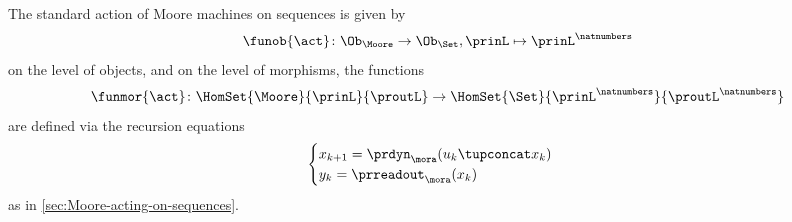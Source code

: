 \begin{definition}
\label{def:moore-standard-action-on-sequences}
The standard action of Moore machines on sequences is given by 
\begin{equation}
\funob{\act} \colon \Ob_{\Moore} \to \Ob_{\Set}, \prinL \mapsto \prinL^\natnumbers
\end{equation}
on the level of objects, and on the level of morphisms, the functions 
\begin{equation}
\funmor{\act} \colon  \HomSet{\Moore}{\prinL}{\proutL} \to \HomSet{\Set}{\prinL^\natnumbers}{\proutL^\natnumbers}
\end{equation}
are defined via the recursion equations
\begin{equation}
    \begin{cases}
        x_{k+1} = \prdyn_\mora(u_k \tupconcat x_k) \\
        y_{k}   = \prreadout_\mora(x_{k})
    \end{cases}
\end{equation}
as in \cref{sec:Moore-acting-on-sequences}. 
\end{definition}



